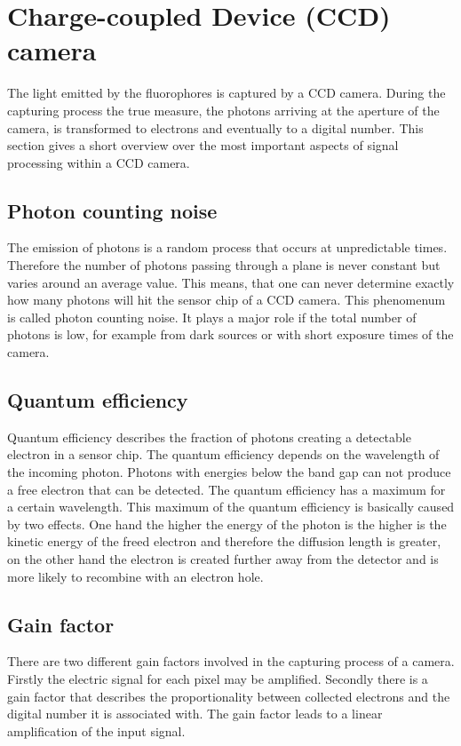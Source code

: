 \section{Charge-coupled Device (CCD) camera}
The light emitted by the fluorophores is captured by a CCD camera. During the capturing process the true measure, the photons arriving at the aperture of the camera, is transformed to electrons and eventually to a digital number. This section gives a short overview over the most important aspects of signal processing within a CCD camera.
\subsection{Photon counting noise}
The emission of photons is a random process that occurs at unpredictable times. Therefore the number of photons passing through a plane is never constant but varies around an average value. This means, that one can never determine exactly how many photons will hit the sensor chip of a CCD camera. This phenomenum is called photon counting noise. It plays a major role if the total number of photons is low, for example from dark sources or with short exposure times of the camera.
\subsection{Quantum efficiency}
Quantum efficiency describes the fraction of photons creating a detectable electron in a sensor chip. The quantum efficiency depends on the wavelength of the incoming photon. Photons with energies below the band gap can not produce a free electron that can be detected. The quantum efficiency has a maximum for a certain wavelength. This maximum of the quantum efficiency is basically caused by two effects. One hand the higher the energy of the photon is the higher is the kinetic energy of the freed electron and therefore the diffusion length is greater, on the other hand the electron is created further away from the detector and is more likely to recombine with an electron hole.
\subsection{Gain factor}
There are two different gain factors involved in the capturing process of a camera. Firstly the electric signal for each pixel may be amplified. Secondly there is a gain factor that describes the proportionality between collected electrons and the digital number it is associated with. The gain factor leads to a linear amplification of the input signal.
